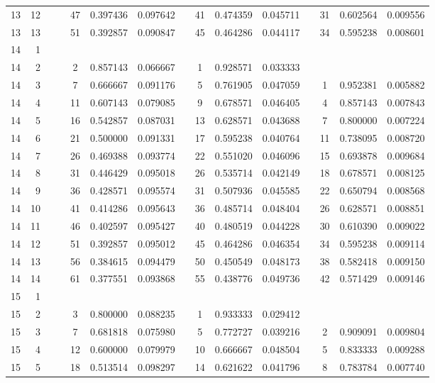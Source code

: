 \begin{appendix}
\begin{longtable}[h]{rrrcccccccccccc}
13	&	12	&&&	47	&	0.397436	&	0.097642	&&	41	&	0.474359	&	0.045711	&&	31	&	0.602564	&	0.009556	\\
13	&	13	&&&	51	&	0.392857	&	0.090847	&&	45	&	0.464286	&	0.044117	&&	34	&	0.595238	&	0.008601	\\
14	&	1	&&&		&		&		&&		&		&		&&		&		&		\\
14	&	2	&&&	2	&	0.857143	&	0.066667	&&	1	&	0.928571	&	0.033333	&&		&		&		\\
14	&	3	&&&	7	&	0.666667	&	0.091176	&&	5	&	0.761905	&	0.047059	&&	1	&	0.952381	&	0.005882	\\
14	&	4	&&&	11	&	0.607143	&	0.079085	&&	9	&	0.678571	&	0.046405	&&	4	&	0.857143	&	0.007843	\\
14	&	5	&&&	16	&	0.542857	&	0.087031	&&	13	&	0.628571	&	0.043688	&&	7	&	0.800000	&	0.007224	\\
14	&	6	&&&	21	&	0.500000	&	0.091331	&&	17	&	0.595238	&	0.040764	&&	11	&	0.738095	&	0.008720	\\
14	&	7	&&&	26	&	0.469388	&	0.093774	&&	22	&	0.551020	&	0.046096	&&	15	&	0.693878	&	0.009684	\\
14	&	8	&&&	31	&	0.446429	&	0.095018	&&	26	&	0.535714	&	0.042149	&&	18	&	0.678571	&	0.008125	\\
14	&	9	&&&	36	&	0.428571	&	0.095574	&&	31	&	0.507936	&	0.045585	&&	22	&	0.650794	&	0.008568	\\
14	&	10	&&&	41	&	0.414286	&	0.095643	&&	36	&	0.485714	&	0.048404	&&	26	&	0.628571	&	0.008851	\\
14	&	11	&&&	46	&	0.402597	&	0.095427	&&	40	&	0.480519	&	0.044228	&&	30	&	0.610390	&	0.009022	\\
14	&	12	&&&	51	&	0.392857	&	0.095012	&&	45	&	0.464286	&	0.046354	&&	34	&	0.595238	&	0.009114	\\
14	&	13	&&&	56	&	0.384615	&	0.094479	&&	50	&	0.450549	&	0.048173	&&	38	&	0.582418	&	0.009150	\\
14	&	14	&&&	61	&	0.377551	&	0.093868	&&	55	&	0.438776	&	0.049736	&&	42	&	0.571429	&	0.009146	\\
15	&	1	&&&		&		&		&&		&		&		&&		&		&		\\
15	&	2	&&&	3	&	0.800000	&	0.088235	&&	1	&	0.933333	&	0.029412	&&		&		&		\\
15	&	3	&&&	7	&	0.681818	&	0.075980	&&	5	&	0.772727	&	0.039216	&&	2	&	0.909091	&	0.009804	\\
15	&	4	&&&	12	&	0.600000	&	0.079979	&&	10	&	0.666667	&	0.048504	&&	5	&	0.833333	&	0.009288	\\
15	&	5	&&&	18	&	0.513514	&	0.098297	&&	14	&	0.621622	&	0.041796	&&	8	&	0.783784	&	0.007740	\\

\end{longtable}
\end{appendix}
